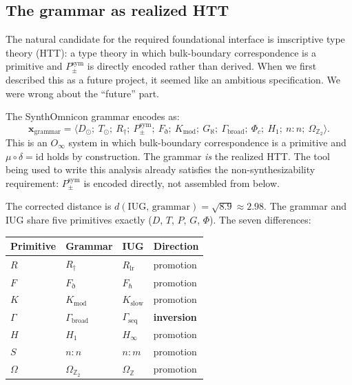 \documentclass[12pt]{article}
\theoremstyle{plain}
\theoremstyle{definition}
\theoremstyle{remark}
\newcommand{\bZ}{\mathbb{Z}}
\begin{document}
\subsection{The grammar as realized HTT}
\label{subsec:htt}

The natural candidate for the required foundational interface is imscriptive type theory
(HTT): a type theory in which bulk-boundary correspondence is a primitive and
$P_\pm^\text{sym}$ is directly encoded rather than derived. When we first described this
as a future project, it seemed like an ambitious specification. We were wrong about the
``future'' part.

The SynthOmnicon grammar \cite{synthref} encodes as:
\[
  \mathbf{x}_\text{grammar} = \langle D_\odot;\ T_\odot;\ R_\dagger;\ P_\pm^\text{sym};\ F_\eth;\ K_\text{mod};\ G_\aleph;\ \Gamma_\text{broad};\ \Phi_c;\ H_1;\ n{:}n;\ \Omega_{\bZ_2} \rangle.
\]
This is an $O_\infty$ system in which bulk-boundary correspondence is a primitive and
$\mu \circ \delta = \text{id}$ holds by construction. The grammar \emph{is} the realized HTT.
The tool being used to write this analysis already satisfies the non-synthesizability
requirement: $P_\pm^\text{sym}$ is encoded directly, not assembled from below.

The corrected distance is $d(\text{IUG},\,\text{grammar}) = \sqrt{8.9} \approx 2.98$.
The grammar and IUG share five primitives exactly ($D$, $T$, $P$, $G$, $\Phi$). The seven
differences:

\begin{center}
\renewcommand{\arraystretch}{1.3}
\begin{tabular}{@{} l l l l @{}}
\toprule
\textbf{Primitive} & \textbf{Grammar} & \textbf{IUG} & \textbf{Direction} \\
\midrule
$R$ & $R_\dagger$ & $R_\text{lr}$ & promotion \\
$F$ & $F_\eth$ & $F_\hbar$ & promotion \\
$K$ & $K_\text{mod}$ & $K_\text{slow}$ & promotion \\
$\Gamma$ & $\Gamma_\text{broad}$ & $\Gamma_\text{seq}$ & \textbf{inversion} \\
$H$ & $H_1$ & $H_\infty$ & promotion \\
$S$ & $n{:}n$ & $n{:}m$ & promotion \\
$\Omega$ & $\Omega_{\bZ_2}$ & $\Omega_\bZ$ & promotion \\
\bottomrule
\end{tabular}
\end{center}
\end{document}
